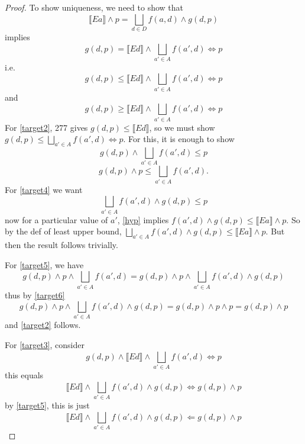 \documentclass{article}
\newcommand{\lb}{\llbracket}
\newcommand{\rb}{\rrbracket}
\theoremstyle{definition}
\begin{document}
\begin{proof}
    To show uniqueness, we need to show that 
    \begin{equation}\label{hyp}
        \lb Ea \rb \wedge p = \bigsqcup_{d \in D} f(a, d) \wedge g(d, p)
    \end{equation}
    implies 
    \begin{equation}\label{target1}
        g(d, p) = \lb Ed \rb \wedge \bigsqcup_{a' \in A} f(a', d) \Leftrightarrow p 
    \end{equation}
    i.e.
    \begin{equation}\label{target2}
        g(d, p) \leq \lb Ed \rb \wedge \bigsqcup_{a' \in A} f(a', d) \Leftrightarrow p 
    \end{equation}
    and 
    \begin{equation}\label{target3}
        g(d, p) \geq \lb Ed \rb \wedge \bigsqcup_{a' \in A} f(a', d) \Leftrightarrow p 
    \end{equation}
    For \eqref{target2}, 277 gives $g(d, p) \leq \lb Ed \rb$, so we must show $g(d,p) \leq \bigsqcup_{a' \in A} f(a', d) \Leftrightarrow p$.
    For this, it is enough to show
    \begin{equation}\label{target4}
        g(d,p) \wedge \bigsqcup_{a' \in A} f(a', d) \leq p 
    \end{equation}
    \begin{equation}\label{target5}
        g(d,p) \wedge p \leq \bigsqcup_{a' \in A} f(a', d).
    \end{equation}
    For \eqref{target4} we want 
    \begin{equation}\label{target6}
         \bigsqcup_{a' \in A} f(a', d) \wedge g(d, p) \leq p 
    \end{equation}
    now for a particular value of $a'$, \eqref{hyp} implies $f(a', d) \wedge g(d, p) \leq \lb Ea \rb \wedge p$.
    So by the def of least upper bound, $\bigsqcup_{a' \in A} f(a', d) \wedge g(d, p) \leq \lb Ea \rb \wedge p$. But
    then the result follows trivially.

    For \eqref{target5}, we have 
    \[
        g(d,p) \wedge p \wedge \bigsqcup_{a' \in A} f(a', d) =  g(d,p) \wedge p \wedge \bigsqcup_{a' \in A} f(a', d) \wedge g(d, p)
    \]
    thus by \eqref{target6}
    \[
        g(d,p) \wedge p \wedge \bigsqcup_{a' \in A} f(a', d) \wedge g(d, p) = g(d,p) \wedge p \wedge p = g(d,p) \wedge p
    \]
    and \eqref{target2} follows.

    For \eqref{target3}, consider
    \begin{equation}
        g(d, p) \wedge \lb Ed \rb \wedge \bigsqcup_{a' \in A} f(a', d) \Leftrightarrow p 
    \end{equation}
    this equals 
    \begin{equation}
        \lb Ed \rb \wedge \bigsqcup_{a' \in A} f(a', d) \wedge g(d, p) \Leftrightarrow g(d, p) \wedge p 
    \end{equation}
    by \eqref{target5}, this is just
    \begin{equation}
        \lb Ed \rb \wedge \bigsqcup_{a' \in A} f(a', d) \wedge g(d, p) \Leftarrow g(d, p) \wedge p 
    \end{equation}
\end{proof}
\end{document}
